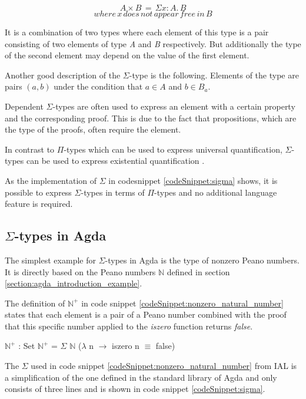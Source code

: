$$A \times B \,= \,\Sigma x:A. \, B$$
$$where \, x \, does \, not \, appear \, free \, in \, B$$

It is a combination of two types where each element of this type is a pair consisting of two elements of type \emph{A} and \emph{B} respectively.
But additionally the type of the second element may depend on the value of the first element.

Another good description of the $\Sigma$-type is the following. 
Elements of the type are pairs $(a, b)$ under the condition that $a \in A$ and $b \in B_a$.

Dependent $\Sigma$-types are often used to express an element with a certain property and the corresponding proof.
This is due to the fact that propositions, which are the type of the proofs, often require the element.

In contrast to $\Pi$-types which can be used to express universal quantification, $\Sigma$-types can be used to express existential quantification \cite{plfa2019}.

As the implementation of $\Sigma$ in codesnippet \ref{codeSnippet:sigma} shows, it is possible to express $\Sigma$-types in terms of $\Pi$-types and no additional language feature is required.

\subsection{$\Sigma$-types in Agda}
The simplest example for $\Sigma$-types in Agda is the type of nonzero Peano numbers.
It is directly based on the Peano numbers $\mathbb{N}$ defined in section \ref{section:agda_introduction_example}.

The definition of $\mathbb{N}^+$ in code snippet \ref{codeSnippet:nonzero_natural_number} states that each element is a pair of a Peano number combined with the proof that this specific number applied to the \emph{iszero} function returns \emph{false}.

\begin{codesnippet}[mathescape=true, caption={Definition of nonzero Peano numbers in Agda}, label={codeSnippet:nonzero_natural_number}]
$\mathbb{N}^+$ : Set
$\mathbb{N}^+$ = $\Sigma$ $\mathbb{N}$ ($\lambda$ n $\rightarrow$ iszero n $\equiv$ false)
\end{codesnippet}

The $\Sigma$ used in code snippet \ref{codeSnippet:nonzero_natural_number} from IAL is a simplification of the one defined in the standard library of Agda and only consists of three lines and is shown in code snippet \ref{codeSnippet:sigma}.

